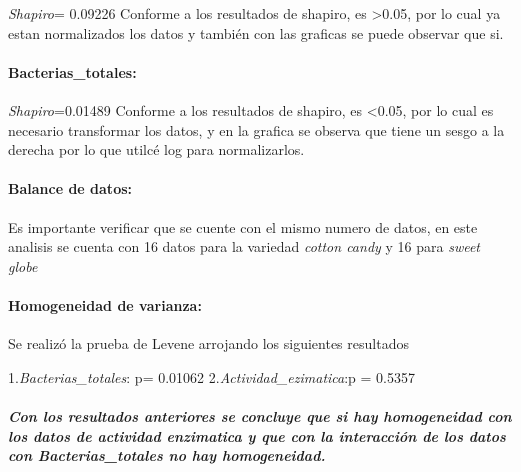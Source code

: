 \documentclass[
]{article}
\begin{document}
\emph{Shapiro}= 0.09226 Conforme a los resultados de shapiro, es
\textgreater0.05, por lo cual ya estan normalizados los datos y también
con las graficas se puede observar que si.

\hypertarget{bacterias_totales}{%
\paragraph{\texorpdfstring{\textbf{Bacterias\_totales}:}{Bacterias\_totales:}}\label{bacterias_totales}}

\emph{Shapiro}=0.01489 Conforme a los resultados de shapiro, es
\textless0.05, por lo cual es necesario transformar los datos, y en la
grafica se observa que tiene un sesgo a la derecha por lo que utilcé log
para normalizarlos.

\hypertarget{balance-de-datos}{%
\paragraph{\texorpdfstring{\textbf{Balance de
datos}:}{Balance de datos:}}\label{balance-de-datos}}

Es importante verificar que se cuente con el mismo numero de datos, en
este analisis se cuenta con 16 datos para la variedad \emph{cotton
candy} y 16 para \emph{sweet globe}

\hypertarget{homogeneidad-de-varianza}{%
\paragraph{\texorpdfstring{\textbf{Homogeneidad de
varianza}:}{Homogeneidad de varianza:}}\label{homogeneidad-de-varianza}}

Se realizó la prueba de Levene arrojando los siguientes resultados

1.\emph{Bacterias\_totales}: p= 0.01062 2.\emph{Actividad\_ezimatica}:p
= 0.5357

\hypertarget{con-los-resultados-anteriores-se-concluye-que-si-hay-homogeneidad-con-los-datos-de-actividad-enzimatica-y-que-con-la-interacciuxf3n-de-los-datos-con-bacterias_totales-no-hay-homogeneidad.}{%
\subparagraph{Con los resultados anteriores se concluye que si hay
homogeneidad con los datos de actividad enzimatica y que con la
interacción de los datos con Bacterias\_totales no hay
homogeneidad.}\label{con-los-resultados-anteriores-se-concluye-que-si-hay-homogeneidad-con-los-datos-de-actividad-enzimatica-y-que-con-la-interacciuxf3n-de-los-datos-con-bacterias_totales-no-hay-homogeneidad.}}
\end{document}
